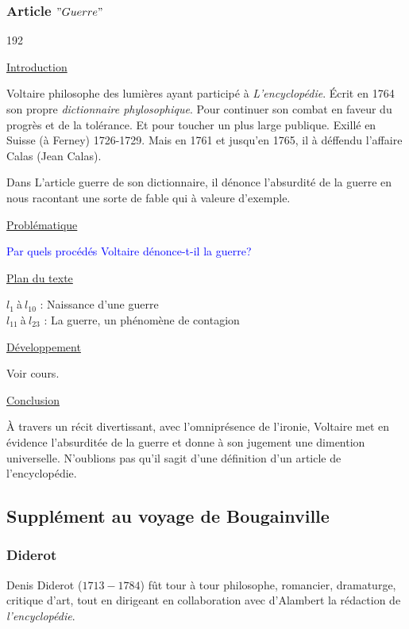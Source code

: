 \documentclass[12pt,a4paper]{article}
\begin{document}
				\subsubsection{Article $"Guerre"$}

\begin{dingautolist}{192}

\item \underline{Introduction} \par
	Voltaire philosophe des lumi\`eres ayant particip\'e \`a \textit{L'encyclop\'edie}. \'Ecrit en 1764 son propre \textit{dictionnaire phylosophique}. 
	Pour continuer son combat en faveur du progr\`es et de la tol\'erance. Et pour toucher un plus large publique. Exill\'e en Suisse (\`a Ferney) 1726-1729. Mais en 1761 et jusqu'en 1765, il \`a d\'effendu l'affaire Calas (Jean Calas).\par
	Dans L'article guerre de son dictionnaire, il d\'enonce l'absurdit\'e de la guerre en nous racontant une sorte de fable qui \`a valeure d'exemple.
	
\item \underline{Probl\'ematique }\par
	\textcolor{blue}{Par quels proc\'ed\'es Voltaire d\'enonce-t-il la guerre?}

\item \underline{Plan du texte} \par
	$l_{1}~$\`a$~l_{10}$ : Naissance d'une guerre \\
	$l_{11}~$\`a$~l_{23}$ : La guerre, un ph\'enom\`ene de contagion

\item \underline{D\'eveloppement} \par
        Voir cours.

\item \underline{Conclusion} \par
	\`A travers un r\'ecit divertissant, avec l'omnipr\'esence de l'ironie, Voltaire met en \'evidence l'absurdit\'ee de la guerre et donne \`a son jugement une dimention universelle. N'oublions pas qu'il sagit d'une d\'efinition d'un article de l'encyclop\'edie. 

\end{dingautolist}
 \newpage

				\subsection{Suppl\'ement au voyage de Bougainville}
					\subsubsection{Diderot}
Denis Diderot ($1713-1784$) f\^ut tour \`a tour philosophe, romancier, dramaturge, critique d'art, tout en dirigeant en collaboration avec d'Alambert la r\'edaction de \textit{l'encyclop\'edie}.
\end{document}
